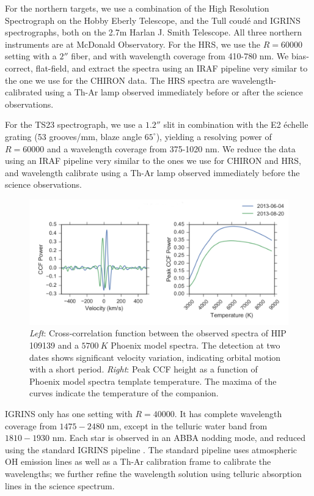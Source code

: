 \documentclass{emulateapj}
\begin{document}
For the northern targets, we use a combination of the High Resolution Spectrograph \citep[HRS,][]{HRS} on the Hobby Eberly Telescope, and the Tull coud\'e \citep[TS23,][]{TS23} and IGRINS \citep{IGRINS} spectrographs, both on the 2.7m Harlan J. Smith Telescope. All three northern instruments are at McDonald Observatory. For the HRS, we use the $R = 60000$ setting with a $2''$ fiber, and with wavelength coverage from 410-780 nm. We bias-correct, flat-field, and extract the spectra using an IRAF pipeline very similar to the one we use for the CHIRON data. The HRS spectra are wavelength-calibrated using a Th-Ar lamp observed immediately before or after the science observations.

For the TS23 spectrograph, we use a $1.2''$ slit in combination with the E2 \'echelle grating (53 grooves/mm, blaze angle $65^{\circ}$), yielding a resolving power of $R=60000$ and a wavelength coverage from 375-1020 nm. We reduce the data using an IRAF pipeline very similar to the ones we use for CHIRON and HRS, and wavelength calibrate using a Th-Ar lamp observed immediately before the science observations.

\begin{figure}
\includegraphics[width=\textwidth]{HIP_109139.pdf}
\caption{\emph{Left}: Cross-correlation function between the observed spectra of HIP 109139 and a $5700\ K$ Phoenix model spectra. The detection at two dates shows significant velocity variation, indicating orbital motion with a short period. \emph{Right}: Peak CCF height as a function of Phoenix model spectra template temperature. The maxima of the curves indicate the temperature of the companion.}
\label{fig:ccf}
\end{figure}

IGRINS only has one setting with $R = 40000$. It has complete wavelength coverage from $1475-2480$ nm, except in the telluric water band from $1810 - 1930$ nm. Each star is observed in an ABBA nodding mode, and reduced using the standard IGRINS pipeline \citep{IGRINS_plp_v2}. The standard pipeline uses atmospheric OH emission lines as well as a Th-Ar calibration frame to calibrate the wavelengths; we further refine the wavelength solution using telluric absorption lines in the science spectrum.
\end{document}
